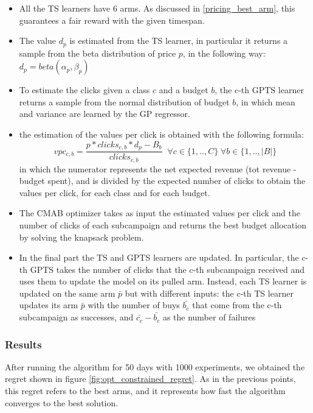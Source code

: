 \begin{itemize}
    \item All the TS learners have 6 arms. As discussed in \ref{pricing_best_arm}, this guarantees a fair reward with the given timespan. 
    \item The value $d_p$ is estimated from the TS learner, in particular it returns a sample from the beta distribution of price $p$, in the following way: $d_p = beta(\alpha_p, \beta_p)$
    \item To estimate the clicks given a class $c$ and a budget $b$, the c-th GPTS learner returns a sample from the normal distribution of budget $b$, in which mean and variance are learned by the GP regressor.
    \item the estimation of the values per click is obtained with the following formula: 
    \[ vpc_{c,b} = \frac{p * clicks_{c,b} * d_p - B_b}{clicks_{c,b}} \;\; \forall c \in \{1,..,C\} \; \forall b \in \{1,..,|B|\} \]
    in which the numerator represents the net expected revenue (tot revenue - budget spent), and is divided by the expected number of clicks to obtain the values per click, for each class and for each budget.
    \item The CMAB optimizer takes as input the estimated values per click and the number of clicks of each subcampaign and returns the best budget allocation by solving the knapsack problem.
    \item In the final part the TS and GPTS learners are updated. In particular, the c-th GPTS takes the number of clicks that the c-th subcampaign received and uses them to update the model on its pulled arm.
    Instead, each TS learner is updated on the same arm $\bar{p}$ but with different inputs: the c-th TS learner updates its arm $\bar{p}$ with the number of buys $\bar{b_c}$ that come from the c-th subcampaign as successes, and $\bar{c_c} - \bar{b_c}$ as the number of failures
\end{itemize}

\subsubsection{Results}
After running the algorithm for 50 days with 1000 experiments, we obtained the regret shown in figure \ref{fig:opt_constrained_regret}.
As in the previous points, this regret refers to the best arms, and it represents how fast the algorithm converges to the best solution.


